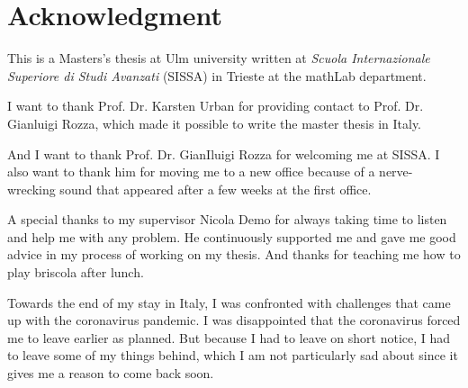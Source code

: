 \chapter*{Acknowledgment}
This is a Masters's thesis at Ulm university written at \textit{Scuola Internazionale Superiore di Studi Avanzati} (SISSA) in Trieste at the mathLab department.

I want to thank Prof. Dr. Karsten Urban for providing contact to  Prof. Dr. Gianluigi Rozza, which made it possible to write the master thesis in Italy.

And I want to thank Prof. Dr. GianIluigi Rozza for welcoming me at SISSA.
I also want to thank him for moving me to a new office because of a nerve-wrecking sound that appeared after a few weeks at the first office.

A special thanks to my supervisor Nicola Demo for always taking time to listen and help me with any problem.
He continuously supported me and gave me good advice in my process of working on my thesis.
And thanks for teaching me how to play briscola after lunch.

Towards the end of my stay in Italy, I was confronted with challenges that came up with the coronavirus pandemic.
I was disappointed that the coronavirus forced me to leave earlier as planned.
But because I had to leave on short notice, I had to leave some of my things behind, which I am not particularly sad about since it gives me a reason to come back soon.



